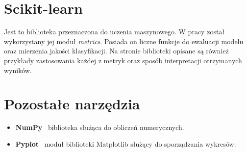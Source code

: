 \section{Scikit-learn}
\label{sec:scikit}

Jest to biblioteka przeznaczona do uczenia maszynowego. W pracy został wykorzystany jej moduł \textit{metrics}\cite{scikit}. Posiada on liczne funkcje do ewaluacji modelu oraz mierzenia jakości klasyfikacji. Na stronie biblioteki opisane są również przykłady zastosowania każdej z metryk oraz sposób interpretacji otrzymanych wyników.

\section{Pozostałe narzędzia}
\label{sec:pozostale}
\begin{itemize}
  \item \textbf{NumPy} \textendash \ biblioteka służąca do obliczeń numerycznych.
  \item \textbf{Pyplot} \textendash \ moduł biblioteki Matplotlib służący do sporządzania wykresów.
\end{itemize}


